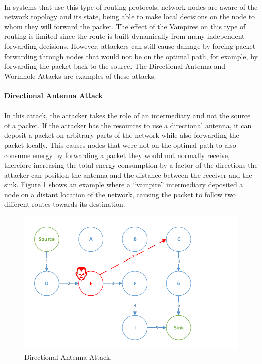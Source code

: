 \paragraph{}
In systems that use this type of routing protocols, network nodes are aware of the network topology and its state, being able to make local decisions on the node to whom they will forward the packet. The effect of the Vampires on this type of routing is limited since the route is built dynamically from many independent forwarding decisions. However, attackers can still cause damage by forcing packet forwarding through nodes that would not be on the optimal path, for example, by forwarding the packet back to the source. The Directional Antenna and Wormhole Attacks are examples of these attacks.

\paragraph{\textbf{Directional Antenna Attack}}
\paragraph{}
In this attack, the attacker takes the role of an intermediary and not the source of a packet. If the attacker has the resources to use a directional antenna, it can deposit a packet on arbitrary parts of the network while also forwarding the packet locally. This causes nodes that were not on the optimal path to also consume energy by forwarding a packet they would not normally receive, therefore increasing the total energy consumption by a factor of the directions the attacker can position the antenna and the distance between the receiver and the sink. Figure \ref{fig:directional_antenna_attack} shows an example where a ``vampire'' intermediary deposited a node on a distant location of the network, causing the packet to follow two different routes towards its destination.

\begin{figure}[h]
  \centering
  \includegraphics[width=0.8\linewidth]{figures/Directional_Antenna_Attack.pdf}
  \caption{Directional Antenna Attack.}
  \label{fig:directional_antenna_attack}
\end{figure}

